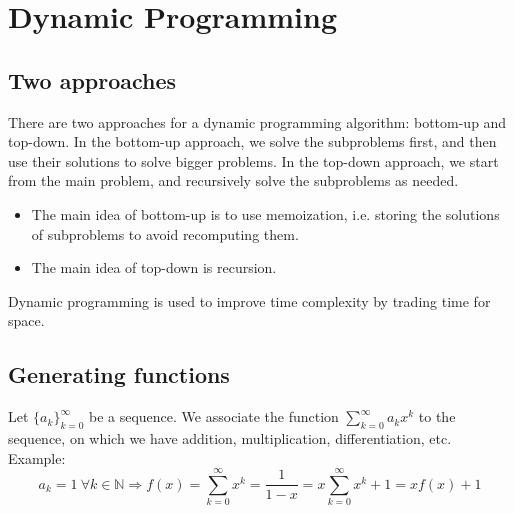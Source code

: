 \documentclass[12pt, openany]{report}
\newcommand{\N}{\mathbb{N}}
\theoremstyle{definition}
\begin{document}
\chapter{Dynamic Programming}
\section{Two approaches}
There are two approaches for a dynamic programming algorithm: bottom-up and top-down. In the bottom-up approach, we solve the subproblems first, and then use their solutions to solve bigger problems. In the top-down approach, we start from the main problem, and recursively solve the subproblems as needed. \\
\begin{itemize}
	\item The main idea of bottom-up is to use memoization, i.e. storing the solutions of subproblems to avoid recomputing them. 
	\item The main idea of top-down is recursion.
\end{itemize}
Dynamic programming is used to improve time complexity by trading time for space.
\section{Generating functions}
Let $\{a_k\}_{k=0}^\infty$ be a sequence. We associate the function $\sum_{k=0}^\infty a_kx^k$ to the sequence, on which we have addition, multiplication, differentiation, etc. \\ Example: 
\begin{equation}
	a_k = 1 \ \forall k\in \N \Longrightarrow f(x) = \sum_{k=0}^\infty x^k = \frac{1}{1-x} = x \sum_{k=0}^\infty x^k + 1 = xf(x) + 1
\end{equation}
\end{document}
